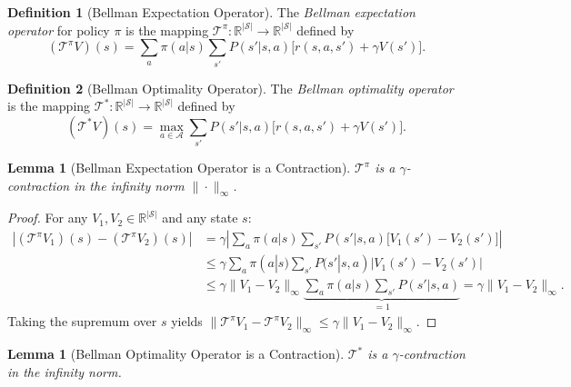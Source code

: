 \documentclass[11pt,a4paper]{article}
\theoremstyle{definition}
\newtheorem{definition}{Definition}[section]
\theoremstyle{plain}
\newtheorem{lemma}[theorem]{Lemma}
\theoremstyle{remark}
\newcommand{\R}{\mathbb{R}}
\begin{document}
\begin{definition}[Bellman Expectation Operator]
\label{def:bellman_operator}
The \emph{Bellman expectation operator} for policy $\pi$ is the mapping $\mathcal{T}^\pi: \R^{|\mathcal{S}|} \to \R^{|\mathcal{S}|}$ defined by
\begin{equation}
    (\mathcal{T}^\pi V)(s) = \sum_{a} \pi(a|s) \sum_{s'} P(s'|s,a)\bigl[r(s,a,s') + \gamma V(s')\bigr].
    \label{eq:bellman_operator}
\end{equation}
\end{definition}

\begin{definition}[Bellman Optimality Operator]
\label{def:bellman_opt_operator}
The \emph{Bellman optimality operator} is the mapping $\mathcal{T}^*: \R^{|\mathcal{S}|} \to \R^{|\mathcal{S}|}$ defined by
\begin{equation}
    (\mathcal{T}^* V)(s) = \max_{a \in \mathcal{A}} \sum_{s'} P(s'|s,a)\bigl[r(s,a,s') + \gamma V(s')\bigr].
    \label{eq:bellman_opt_operator}
\end{equation}
\end{definition}

\begin{lemma}[Bellman Expectation Operator is a Contraction]
\label{lem:bellman_contraction}
$\mathcal{T}^\pi$ is a $\gamma$-contraction in the infinity norm $\|\cdot\|_\infty$.
\end{lemma}

\begin{proof}
For any $V_1, V_2 \in \R^{|\mathcal{S}|}$ and any state $s$:
\begin{align}
    |(\mathcal{T}^\pi V_1)(s) - (\mathcal{T}^\pi V_2)(s)|
    &= \gamma \left|\sum_{a} \pi(a|s) \sum_{s'} P(s'|s,a)\bigl[V_1(s') - V_2(s')\bigr]\right| \nonumber\\
    &\leq \gamma \sum_{a} \pi(a|s) \sum_{s'} P(s'|s,a) |V_1(s') - V_2(s')| \nonumber\\
    &\leq \gamma \|V_1 - V_2\|_\infty \underbrace{\sum_{a} \pi(a|s) \sum_{s'} P(s'|s,a)}_{=1}
    = \gamma \|V_1 - V_2\|_\infty. \label{eq:bellman_contraction_proof}
\end{align}
Taking the supremum over $s$ yields $\|\mathcal{T}^\pi V_1 - \mathcal{T}^\pi V_2\|_\infty \leq \gamma \|V_1 - V_2\|_\infty$.
\end{proof}

\begin{lemma}[Bellman Optimality Operator is a Contraction]
\label{lem:bellman_opt_contraction}
$\mathcal{T}^*$ is a $\gamma$-contraction in the infinity norm.
\end{lemma}
\end{document}
